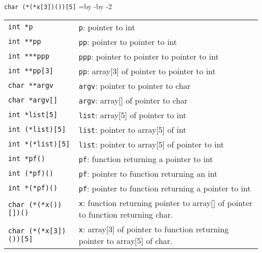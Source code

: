 \hbox{\texttt{char (*(*x[3])())[5]}}
\newdimen\delengte\delengte=\textwidth\advance\delengte by -\advance\delengte by -2\tabcolsep
\begin{table}[!ht]
\begin{tabular}{@{}lp{\delengte}@{}}
\texttt{int *p} & \texttt{p}: pointer to int\\
\texttt{int **pp} & \texttt{pp}: pointer to pointer to int \\
\texttt{int ***ppp} & \texttt{ppp}: pointer to pointer to pointer to int \\
\texttt{int **pp[3]} & \texttt{pp}: array[3] of pointer to pointer to int \\
\texttt{char **argv} & \texttt{argv}: pointer to pointer to char \\
\texttt{char *argv[]} &\texttt{argv}: array[] of pointer to char \\
\texttt{int *list[5]} & \texttt{list}: array[5] of pointer to int \\
\texttt{int (*list)[5]} & \texttt{list}: pointer to array[5] of int \\
\texttt{int *(*list)[5]} & \texttt{list}: pointer to array[5] of pointer to int \\
\texttt{int *pf()} & \texttt{pf}: function returning a pointer to int \\
\texttt{int (*pf)()} & \texttt{pf}: pointer to function returning an int \\
\texttt{int *(*pf)()} & \texttt{pf}: pointer to function returning a pointer to int \\
\texttt{char (*(*x())[])()} & \texttt{x}: function returning pointer to array[] of pointer to function returning char.\\
\texttt{char (*(*x[3])())[5]} & \texttt{x}: array[3] of pointer to function returning pointer to array[5] of char.\\
\end{tabular}
\end{table}
\basic
